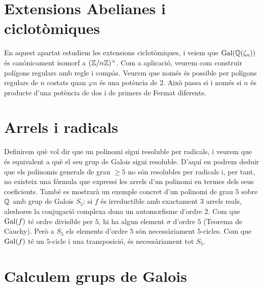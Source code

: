 \documentclass[
]{book}
\theoremstyle{definition}
\theoremstyle{definition}
\theoremstyle{definition}
\theoremstyle{definition}
\theoremstyle{remark}
\begin{document}
\hypertarget{extensions-abelianes-i-ciclotuxf2miques}{%
\chapter{Extensions Abelianes i ciclotòmiques}\label{extensions-abelianes-i-ciclotuxf2miques}}

En aquest apartat estudiem les extensions ciclotòmiques, i veiem que \(\operatorname{Gal}(\mathbb{Q}(\zeta_n))\)
és canònicament isomorf a \((\mathbb{Z}/n\mathbb{Z})^\times\). Com a aplicació, veurem com construir
polígons regulars amb regle i compàs. Veurem que només és possible per polígons regulars
de \(n\) costats quan \(\varphi{n}\) és una potència de \(2\). Això passa si i només si \(n\) és producte
d'una potència de dos i de primers de Fermat diferents.

\hypertarget{arrels-i-radicals}{%
\chapter{Arrels i radicals}\label{arrels-i-radicals}}

Definirem què vol dir que un polinomi sigui resoluble per radicals, i veurem
que és equivalent a què el seu grup de Galois sigui resoluble. D'aquí en podrem
deduir que els polinomis generals de grau \(\geq 5\) no són resolubles per radicals i,
per tant, no existeix una fórmula que expressi les arrels d'un polinomi en termes
dels seus coeficients. També es mostrarà un exemple concret d'un polinomi de grau \(5\) sobre \(\mathbb{Q}\)
amb grup de Galois \(S_5\): si \(f\) és irreductible amb exactament \(3\) arrels reals, aleshores la conjugació complexa dona un automorfisme d'ordre \(2\). Com que \(\operatorname{Gal}(f)\) té ordre divisible per \(5\), hi ha algun element \(\sigma\) d'ordre \(5\) (Teorema de Cauchy). Però a \(S_5\) els elements d'ordre \(5\) són necessàriament \(5\)-cicles. Com que \(\operatorname{Gal}(f)\) té un \(5\)-cicle i una transposició, és necessàriament tot \(S_5\).

\hypertarget{calculem-grups-de-galois}{%
\chapter{Calculem grups de Galois}\label{calculem-grups-de-galois}}

\nocite{*}

  
\end{document}
